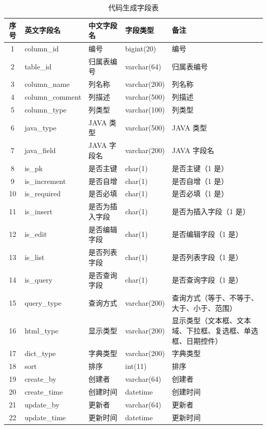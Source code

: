 \documentclass{izdthesis}
\begin{document}
\begin{table}[H]
  \centering
  \caption{代码生成字段表}
  \label{tab4-14}
  \songti
  \begin{tabular}{c l l l p{4.5cm}}
    \toprule
    序号 & 英文字段名 & 中文字段名 & 字段类型 & 备注 \\
    \midrule
    1 & column\_id & 编号 & bigint(20) & 编号 \\
    2 & table\_id & 归属表编号 & varchar(64) & 归属表编号 \\
    3 & column\_name & 列名称 & varchar(200) & 列名称 \\
    4 & column\_comment & 列描述 & varchar(500) & 列描述 \\
    5 & column\_type & 列类型 & varchar(100) & 列类型 \\
    6 & java\_type & JAVA 类型 & varchar(500) & JAVA 类型 \\
    7 & java\_field & JAVA 字段名 & varchar(200) & JAVA 字段名 \\
    8 & is\_pk & 是否主键 & char(1) & 是否主键（1 是） \\
    9 & is\_increment & 是否自增 & char(1) & 是否自增（1 是） \\
    10 & is\_required & 是否必填 & char(1) & 是否必填（1 是） \\
    11 & is\_insert & 是否为插入字段 & char(1) & 是否为插入字段（1 是） \\
    12 & is\_edit & 是否编辑字段 & char(1) & 是否编辑字段（1 是） \\
    13 & is\_list & 是否列表字段 & char(1) & 是否列表字段（1 是） \\
    14 & is\_query & 是否查询字段 & char(1) & 是否查询字段（1 是） \\
    15 & query\_type & 查询方式 & varchar(200) & 查询方式（等于、不等于、大于、小于、范围） \\
    16 & html\_type & 显示类型 & varchar(200) & 显示类型（文本框、文本域、下拉框、复选框、单选框、日期控件） \\
    17 & dict\_type & 字典类型 & varchar(200) & 字典类型 \\
    18 & sort & 排序 & int(11) & 排序 \\
    19 & create\_by & 创建者 & varchar(64) & 创建者 \\
    20 & create\_time & 创建时间 & datetime & 创建时间 \\
    21 & update\_by & 更新者 & varchar(64) & 更新者 \\
    22 & update\_time & 更新时间 & datetime & 更新时间 \\
    \bottomrule
  \end{tabular}
\end{table}
\end{document}

